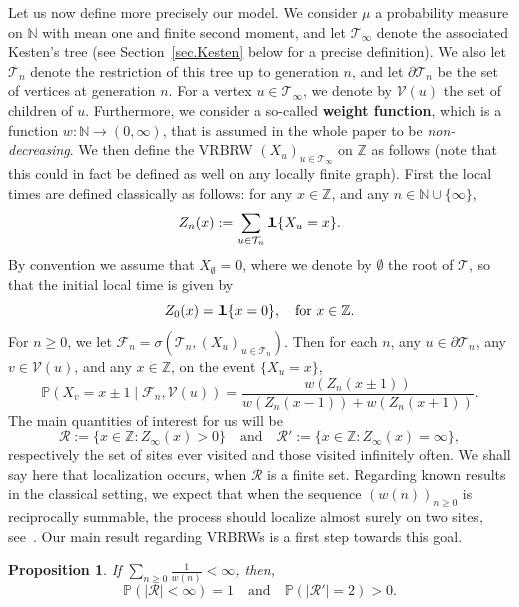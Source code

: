 \documentclass[11pt]{article}
\newtheorem {prop} {Proposition} [section]
\newcommand{\1}{{\text{\Large $\mathfrak 1$}}}
\begin{document}
\vspace{0.2cm}
Let us now define more precisely our model. 
We consider $\mu$ a probability measure on $\mathbb N$ with mean one and finite second moment, and let $\mathcal T_\infty$ denote the associated Kesten's tree (see Section~\ref{sec.Kesten} below for a precise definition). We also let $\mathcal T_n$ denote the restriction of this tree up to generation $n$, and let $\partial \mathcal T_n$ be the set of vertices at generation $n$. 
For a vertex $u\in \mathcal T_\infty$, we denote by $\mathcal V(u)$ the set of children of $u$. 
Furthermore, we consider a so-called \textbf{weight function}, which is a function $w:\mathbb N\to (0,\infty)$, that is assumed in the whole paper to be {\it non-decreasing}. We then define the VRBRW $(X_u)_{u\in \mathcal T_\infty}$ on $\mathbb Z$ as follows (note that this could in fact be defined as well on any locally finite graph). 
First the local times are defined classically as follows: for any $x\in \mathbb Z$, and any $n\in \mathbb N\cup \{\infty\}$,  
$$Z_n(x) := \sum_{u\in \mathcal T_n} \1\{X_u = x\}. $$ 
By convention we assume that $X_\emptyset = 0$, where we denote by $\emptyset$ the root of $\mathcal T$, so that the initial local time is given by 
$$Z_0(x) = \1\{x=0\},\quad \text{for }x\in \mathbb Z.$$ 
For $n\ge 0$, we let $\mathcal F_n = \sigma(\mathcal T_n, (X_u)_{u\in \mathcal T_n})$.    
Then for each $n$, any $u\in \partial \mathcal T_n$, any $v\in \mathcal V(u)$, and any $x\in \mathbb Z$, on the event $\{X_u = x\}$, 
\begin{equation}\label{def.process}
\mathbb P(X_v = x\pm 1 \mid  \mathcal F_n, \mathcal V(u)) = \frac{w(Z_n(x\pm 1))}{w(Z_n(x-1)) + w(Z_n(x+1))}.
\end{equation}
The main quantities of interest for us will be  
$$\mathcal R:= \{x \in \mathbb Z : Z_\infty(x) >0\} \quad \text{and}\quad \mathcal R':=\{x\in \mathbb Z : Z_\infty(x) = \infty\},$$
respectively the set of sites ever visited and those visited infinitely often. We shall say here that localization occurs, when $\mathcal R$ is a finite set. Regarding known results in the classical setting, we expect that when the sequence $(w(n))_{n\ge 0}$ is reciprocally summable, the process should localize almost surely on two sites, see~\cite{V,BSS}. Our main result regarding VRBRWs is a first step towards this goal.   

\begin{prop} \label{prop.strong}
If $\sum_{n\ge 0} \tfrac 1{w(n)}<\infty$, then, 
$$\mathbb P(|\mathcal R|<\infty) = 1 \quad \text{and}\quad \mathbb P(|\mathcal R'|=2)>0.$$ 
\end{prop}
\end{document}
